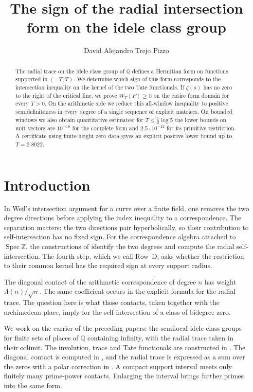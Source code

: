 \documentclass[11pt]{amsart}
\theoremstyle{definition}
\theoremstyle{remark}
\begin{document}
\title[The sign of the radial intersection form]{The sign of the radial intersection form on the idele class group}
\author{David Alejandro Trejo Pizzo}
\date{}
\begin{abstract}
The radial trace on the idele class group of $\mathbb Q$ defines a Hermitian
form on functions supported in $(-T,T)$. We determine which sign of this form
corresponds to the intersection inequality on the kernel of the two Tate
functionals. If $\zeta(s)$ has no zero to the right of the critical line,
we prove $W_T(F)\ge0$ on the entire form domain for every $T>0$.
On the arithmetic side we reduce this all-window inequality to positive
semidefiniteness in every degree of a single sequence of explicit matrices.
On bounded windows we also obtain quantitative estimates: for
$T\le\tfrac12\log5$ the lower bounds on unit vectors are $10^{-18}$ for the
complete form and $2.5\cdot10^{-12}$ for its primitive restriction.
A certificate using finite-height zero data gives an explicit positive
lower bound up to $T=2.8022$.
\end{abstract}
\maketitle
\setcounter{tocdepth}{1}\tableofcontents
\section{Introduction}\label{sec:intro}
In Weil's intersection argument for a curve over a finite field, one removes
the two degree directions before applying the index inequality to a correspondence.
The separation matters: the two directions pair hyperbolically, so their
contribution to self-intersection has no fixed sign. For the correspondence
algebra attached to $\operatorname{Spec}\mathbb Z$, the constructions of \cite{P43,P44,Paper45} identify
the two degrees and compute the radial self-intersection. The fourth step,
which we call Row~D, asks whether the restriction to their common kernel
has the required sign at every support radius.

The diagonal contact of the arithmetic correspondence of degree $n$ has
weight $\Lambda(n)/\sqrt n$. The same coefficient occurs in the explicit
formula for the radial trace. The question here is what those contacts,
taken together with the archimedean place, imply for the self-intersection
of a class of bidegree zero.

We work on the carrier of the preceding papers: the semilocal idele class
groups for finite sets of places of $\mathbb Q$ containing infinity, with
the radial trace taken in their colimit. The involution, trace and Tate functionals
are constructed in \cite{P43}. The diagonal contact is computed in \cite{P44},
and the radial trace is expressed as a sum over the zeros with a polar
correction in \cite{Paper45}.
A compact support interval meets only finitely many prime-power contacts.
Enlarging the interval brings further primes into the same form.
\end{document}
